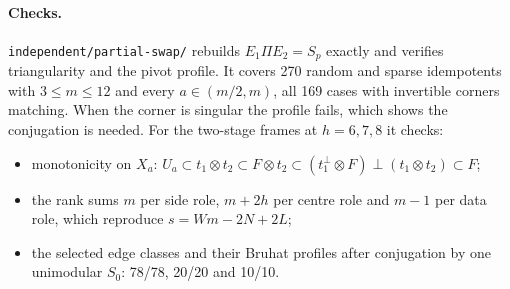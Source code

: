 \documentclass[11pt]{article}
\theoremstyle{remark}\newtheorem*{remark}{Remark}
\begin{document}
\paragraph{Checks.} \texttt{independent/partial-swap/} rebuilds $E_1\Pi E_2=S_p$ exactly and verifies triangularity
and the pivot profile. It covers 270 random and sparse idempotents with $3\le m\le12$ and every $a\in(m/2,m)$, all
169 cases with invertible corners matching. When the corner is singular the profile fails, which shows the
conjugation is needed. For the two-stage frames at $h=6,7,8$ it checks:
\begin{itemize}
\item monotonicity on $X_a$: $U_a\subset t_1\otimes t_2\subset F\otimes t_2\subset(t_1^\perp\otimes F)\perp(t_1\otimes t_2)\subset F$;
\item the rank sums $m$ per side role, $m+2h$ per centre role and $m-1$ per data role, which reproduce $s=Wm-2N+2L$;
\item the selected edge classes and their Bruhat profiles after conjugation by one unimodular $S_0$:
78/78, 20/20 and 10/10.
\end{itemize}
\end{document}
